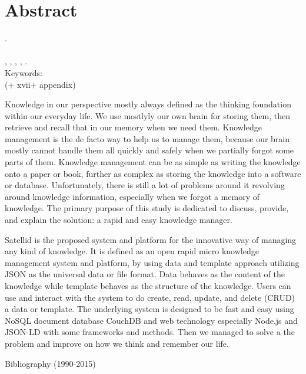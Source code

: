 
\begingroup
\let\clearpage\relax
\let\cleardoublepage\relax

\chapter*{Abstract}
\label{chap:abstract}

\myName. \myNPM \\
\myDepTitle \\
\myThesisType, \myDepartmentLong, \myFacultyLong, \myUni, \myYear. \\
Keywords: \myKeywords \\
(+ xvii+ appendix)

\hfill

Knowledge in our perspective mostly always defined as the thinking foundation within our everyday life.
We use mostlyly our own brain for storing them, then retrieve and recall that in our memory when we need them.
Knowledge management is the de facto way to help us to manage them, because our brain mostly cannot handle them all quickly and safely when we partially forgot some parts of them.
Knowledge management can be as simple as writing the knowledge onto a paper or book, further as complex as storing the knowledge into a software or database.
Unfortunately, there is still a lot of problems around it revolving around knowledge information, especially when we forgot a memory of knowledge.
The primary purpose of this study is dedicated to discuss, provide, and explain the solution: 
a rapid and easy knowledge manager.

Satellid is the proposed system and platform for the innovative way of managing any kind of knowledge.
It is defined as an open rapid micro knowledge management system and platform, by using data and template approach utilizing JSON as the universal data or file format.
Data behaves as the content of the knowledge while template behaves as the structure of the knowledge.
Users can use and interact with the system to do create, read, update, and delete (CRUD) a data or template.
The underlying system is designed to be fast and easy using NoSQL document database CouchDB and web technology especially Node.js and JSON-LD with some frameworks and methods.
Then we managed to solve a the problem and improve on how we think and remember our life.

\hfill

\noindent \myTitle

\noindent Bibliography (1990-2015)




\endgroup

\vfill

